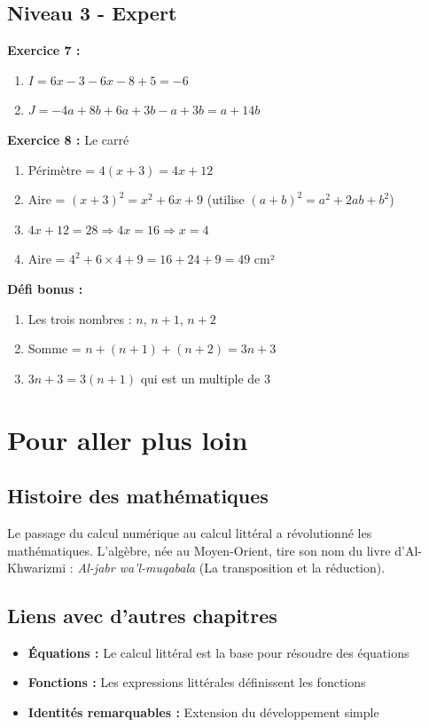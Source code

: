 \subsection{Niveau 3 - Expert}

\begin{correctionbox}
	\textbf{Exercice 7 :}
	\begin{enumerate}[label=\alph*)]
		\item $I = 6x - 3 - 6x - 8 + 5 = -6$
		\item $J = -4a + 8b + 6a + 3b - a + 3b = a + 14b$
	\end{enumerate}
	
	\textbf{Exercice 8 :} Le carré
	\begin{enumerate}
		\item Périmètre = $4(x + 3) = 4x + 12$
		\item Aire = $(x + 3)^2 = x^2 + 6x + 9$ (utilise $(a+b)^2 = a^2 + 2ab + b^2$)
		\item $4x + 12 = 28 \Rightarrow 4x = 16 \Rightarrow x = 4$
		\item Aire = $4^2 + 6 \times 4 + 9 = 16 + 24 + 9 = 49$ cm²
	\end{enumerate}
	
	\textbf{Défi bonus :}
	\begin{enumerate}
		\item Les trois nombres : $n$, $n+1$, $n+2$
		\item Somme = $n + (n+1) + (n+2) = 3n + 3$
		\item $3n + 3 = 3(n + 1)$ qui est un multiple de 3
	\end{enumerate}
\end{correctionbox}

\section{Pour aller plus loin}

\subsection{Histoire des mathématiques}
Le passage du calcul numérique au calcul littéral a révolutionné les mathématiques. L'algèbre, née au Moyen-Orient, tire son nom du livre d'Al-Khwarizmi : \textit{Al-jabr wa'l-muqabala} (La transposition et la réduction).

\subsection{Liens avec d'autres chapitres}
\begin{itemize}
	\item \textbf{Équations :} Le calcul littéral est la base pour résoudre des équations
	\item \textbf{Fonctions :} Les expressions littérales définissent les fonctions
	\item \textbf{Identités remarquables :} Extension du développement simple
\end{itemize}

